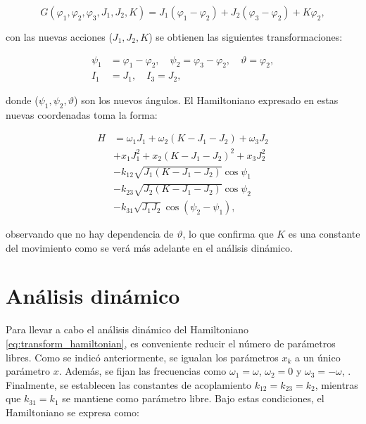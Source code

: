 \begin{equation}
    G(\varphi_{1}, \varphi_{2}, \varphi_{3}, J_{1}, J_{2}, K) = J_{1}(\varphi_{1} - \varphi_{2}) +
    J_{2}(\varphi_{3} - \varphi_{2}) + K \varphi_{2},
    \label{eq:generating_function}
\end{equation}

\noindent con las nuevas acciones ($J_{1}, J_{2}, K$) se obtienen las siguientes transformaciones:

\begin{equation}
    \begin{split}
        \psi_{1} & = \varphi_{1} - \varphi_{2}, \quad \psi_{2} = \varphi_{3} - \varphi_{2},
        \quad \vartheta = \varphi_{2},                                                      \\
        I_{1}    & = J_{1}, \quad I_{3} = J_{2},
    \end{split}
    \label{eq:transformation}
\end{equation}

\noindent donde ($\psi_{1}, \psi_{2}, \vartheta$) son los nuevos ángulos. El Hamiltoniano expresado
en estas nuevas coordenadas toma la forma:

\begin{equation}
    \begin{split}
        H & = \omega_1 J_1 + \omega_2 (K - J_1 - J_2) + \omega_3 J_2 \\
          & + x_1 J_1^2 + x_2 (K - J_1 - J_2)^2 + x_3 J_2^2          \\
          & - k_{12} \sqrt{J_1 (K - J_1 - J_2)} \cos\psi_1           \\
          & - k_{23} \sqrt{J_2 (K - J_1 - J_2)} \cos\psi_2           \\
          & - k_{31} \sqrt{J_1 J_2} \cos(\psi_2 - \psi_1),
    \end{split}
    \label{eq:transform_hamiltonian}
\end{equation}

\noindent observando que no hay dependencia de $\vartheta$, lo que confirma que $K$ es una constante del movimiento
como se verá más adelante en el análisis dinámico.

\section{Análisis dinámico}

Para llevar a cabo el análisis dinámico del Hamiltoniano \eqref{eq:transform_hamiltonian}, es conveniente
reducir el número de parámetros libres. Como se indicó anteriormente, se igualan los parámetros $x_k$ a un
único parámetro $x$. Además, se fijan las frecuencias como $\omega_1 = \omega$, $\omega_2 = 0$ y $\omega_3 = -\omega$,
. Finalmente,
se establecen las constantes de acoplamiento $k_{12} = k_{23} = k_2$, mientras que $k_{31} = k_1$ se
mantiene como parámetro libre. Bajo estas condiciones, el Hamiltoniano se expresa como:

